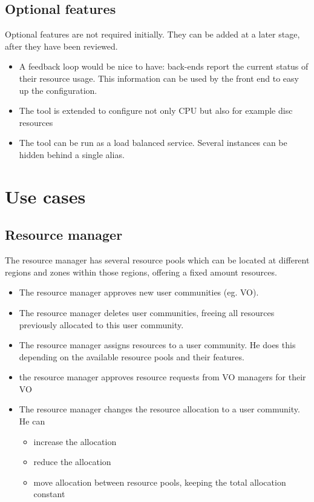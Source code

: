 \documentclass[12pt]{article}
\begin{document}
\subsection{Optional features}
Optional features are not required initially. They can be added at a later stage, after they have been reviewed.
\begin{itemize}
\item A feedback loop would be nice to have: back-ends report the current status of their resource usage. This information can be used by the 
front end to easy up the configuration. 
\item The tool is extended to configure not only CPU but also for example disc resources
\item The tool can be run as a load balanced service. Several instances can be hidden behind a single alias.
\end{itemize}

%
%
%
\section{Use cases}
\subsection{Resource manager}
The resource manager has several resource pools which can be located at different regions and zones within those regions, offering a fixed amount 
resources. 
\begin{itemize}
\item The resource manager approves new user communities (eg. VO). 
\item The resource manager deletes user communities, freeing all resources previously allocated to this user community.
\item The resource manager assigns resources to a user community. He does this depending on the available resource pools and their features.
\item the resource manager approves resource requests from VO managers for their VO
\item The resource manager changes the resource allocation to a user community. He can
 \begin{itemize}
   \item increase the allocation
   \item reduce the allocation 
   \item move allocation between resource pools, keeping the total allocation constant
 \end{itemize}
\end{itemize}
\end{document}
